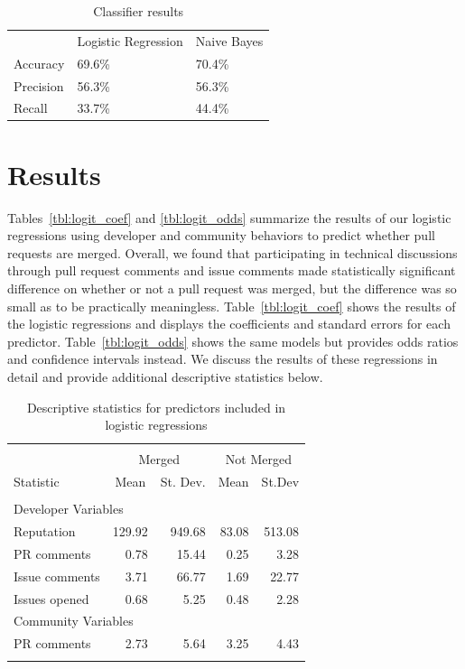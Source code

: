 \documentclass{sigchi}
\begin{document}
\begin{table}[ht] \centering
  \caption{Classifier results}
  \label{tbl:classifiers}
  \begin{tabular}{lll}
  \hline\hline
  ~         & Logistic Regression & Naive Bayes \\
  Accuracy  & 69.6\%              & 70.4\%      \\
  Precision & 56.3\%              & 56.3\%      \\
  Recall    & 33.7\%              & 44.4\%      \\
  \hline
  \end{tabular}
\end{table}

\newpage
\section{Results} \label{chap:results}
Tables~\ref{tbl:logit_coef} and \ref{tbl:logit_odds} summarize the results of our logistic regressions 
using developer and community behaviors to predict whether pull requests are 
merged. Overall, we found that participating in technical discussions through 
pull request comments and issue comments made statistically significant 
difference on whether or not a pull request was merged, but the difference was 
so small as to be practically meaningless. Table~\ref{tbl:logit_coef} shows the 
results of the logistic regressions and displays the coefficients and standard 
errors for each predictor. Table~\ref{tbl:logit_odds} shows the same models but 
provides odds ratios and confidence intervals instead. We discuss the results 
of these regressions in detail and provide additional descriptive statistics below.

\begin{table}[!htbp] \centering 
  \caption{Descriptive statistics for predictors included in logistic regressions} 
  \label{tbl:descriptives} 
\begin{tabular}{@{\extracolsep{5pt}}lrrrr} 
\\[-1.8ex]\hline 
\hline \\[-1.8ex] 
 & \multicolumn{2}{c}{Merged} & \multicolumn{2}{c}{Not Merged} \\ 
Statistic & \multicolumn{1}{c}{Mean} & \multicolumn{1}{c}{St. Dev.} & 
\multicolumn{1}{c}{Mean} & \multicolumn{1}{c}{St.Dev} \\ 
\hline \\[-1.8ex] 
\multicolumn{5}{l}{Developer Variables} \\
Reputation & 129.92 & 949.68 & 83.08 & 513.08  \\  
PR comments & 0.78 & 15.44 & 0.25 & 3.28\\ 
Issue comments & 3.71 & 66.77 & 1.69 & 22.77  \\ 
Issues opened & 0.68 & 5.25 & 0.48 & 2.28 \\ 
\multicolumn{5}{l}{Community Variables} \\
PR comments & 2.73 & 5.64 & 3.25 & 4.43 \\ 
\hline \\[-1.8ex] 
\end{tabular} 
\end{table}
\end{document}
